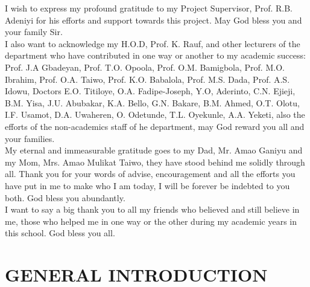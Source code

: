 \documentclass[12pt]{report}
\newcommand{\NI}{\noindent}
\begin{document}
	\NI I wish to express my profound gratitude to my Project Supervisor, Prof. R.B. Adeniyi for his efforts and support towards this project. May God bless you and your family Sir.\\
	
	\NI I also want to acknowledge my H.O.D, Prof. K. Rauf, and other lecturers of the department who have contributed in one way or another to my academic success: Prof. J.A Gbadeyan, Prof. T.O. Opoola, Prof. O.M. Bamigbola, Prof. M.O. Ibrahim, Prof. O.A. Taiwo, Prof. K.O. Babalola, Prof. M.S. Dada, Prof. A.S. Idowu, Doctors E.O. Titiloye, O.A. Fadipe-Joseph, Y.O, Aderinto, C.N. Ejieji, B.M. Yisa, J.U. Abubakar, K.A. Bello, G.N. Bakare, B.M. Ahmed, O.T. Olotu, I.F. Usamot, D.A. Uwaheren, O. Odetunde, T.L. Oyekunle, A.A. Yeketi, also the efforts of the non-academics staff of he department, may God reward you all and your families.\\
	
	\NI My eternal and immeasurable gratitude goes to my Dad, Mr. Amao Ganiyu and my Mom, Mrs. Amao Mulikat Taiwo, they have stood behind me solidly through all. Thank you for your words of advise, encouragement and all the efforts you have put in me to make who I am today, I will be forever be indebted to you both. God bless you abundantly.\\
	
	\NI I want to say a big thank you to all my friends who believed and still believe in me, those who helped me in one way or the other during my academic years in this school. God bless you all.\\
	
	\newpage
	
	\tableofcontents
	
	\newpage
	
	\chapter{GENERAL INTRODUCTION}
	
\end{document}
